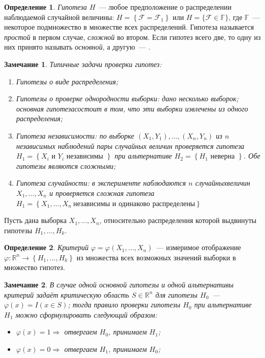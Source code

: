 \documentclass[oneside,final,14pt]{extreport}
\newtheorem*{rmrk}{Замечание}
\theoremstyle{definition}
\newtheorem{defn}{Определение}[section]
\begin{document}
\begin{defn}
{\it Гипотеза \(H\)}~--- любое предположение о распределении наблюдаемой случайной величины: \(H=\left\{\mathcal{F}=\mathcal{F}_{1}\right\} \) или \(H=\{\mathcal{F} \in \mathbb{F}\}\), где \(\mathbb{F}\)~--- некоторое подмножество в множестве всех распределений. Гипотеза называется {\it простой} в первом случае, {\it сложной} во втором. Если гипотез всего две, то одну из них принято называть {\it основной}, а другую~--- {}.
\end{defn}

\begin{rmrk} Типичные задачи проверки гипотез:
\begin{enumerate}
    \item Гипотезы о виде распределения;
    \item Гипотезы о проверке однородности выборки: дано несколько выборок; основная гипотезасостоит в том, что эти выборки извлечены из одного распределения;
    \item Гипотеза независимости: по выборке $(X_1,Y_1), \ldots, (X_n,Y_n)$ из $n$ независимых наблюдений пары случайных величин проверяется гипотеза $H_{1}=\left\{X_{i} \text { и } Y_{i} \text { независимы }\right\}$ при альтернативе $H_{2}=\left\{H_{1} \text { неверна }\right\}$. Обе гипотезы являются сложными;
    \item Гипотеза случайности: в эксперименте наблюдаются $n$ случайныхвеличин $X_{1}, \ldots, X_{n}$ и проверяется сложная гипотеза $H_{1}=\left\{X_{1}, \ldots, X_{n}~ \text{независимы и одинаково распределены}\right\}$
\end{enumerate}
\end{rmrk}

Пусть дана выборка $X_{1}, \ldots, X_{n}$, относительно распределения которой выдвинуты гипотезы $H_{1}, \ldots, H_{k}$.
\begin{defn}
{\it Критерий} $\varphi=\varphi\left(X_{1}, \ldots, X_{n}\right)$~--- измеримое отображение $\varphi: \mathbb{R}^{n} \rightarrow\left\{H_{1}, \ldots, H_{k}\right\}$ из множества всех возможных значений выборки в множество гипотез.
\end{defn}

\begin{rmrk}
В случае одной основной гипотезы и одной альтернативы критерий задаёт критическую область $S \in \mathbb{R}^{n}$ для гипотезы $H_0$~--- $\varphi(x) = I(x \in S)$; тогда правило проверки гипотезы $H_0$ при альтернативе $H_1$ можно сформулировать следующий образом:
\begin{itemize}
    \item $\varphi(x) = 1 \Rightarrow$ отвергаем $H_0$, принимаем $H_1$;
    \item $\varphi(x) = 0 \Rightarrow$ отвергаем $H_1$, принимаем $H_0$;
\end{itemize}
\end{rmrk}
\end{document}
